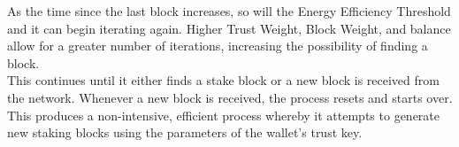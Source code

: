\documentclass[11pt]{article}
\begin{document}
\noindent As the time since the last block increases, so will the Energy Efficiency Threshold and it can begin iterating again. Higher Trust Weight, Block Weight, and balance allow for a greater number of iterations, increasing the possibility of finding a block.\\

\noindent This continues until it either finds a stake block or a new block is received from the network. Whenever a new block is received, the process resets and starts over.\\

\noindent This produces a non-intensive, efficient process whereby it attempts to generate new staking blocks using the parameters of the wallet’s trust key.\\
\end{document}

